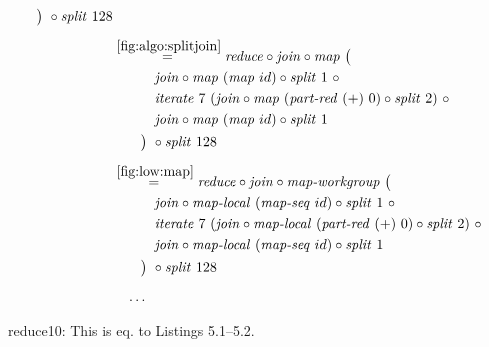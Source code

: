 \begin{figure*}[t]
\begin{align*}
\begin{aligned}
    &\qquad\big)\ \circ \splitN\ 128
  \end{aligned}\\[.5em]
%
  &\hspace{-2em}\quad\begin{aligned}
    &\overset{\ref{fig:algo:splitjoin}}{=\hspace{.2em}}
      \reduce \circ \join \circ \map\ \big(\\
    &\qquad\quad\join \circ \map\ (\map\ id) \circ \splitN\ 1\ \circ\\
    &\qquad\quad\iterateN\ 7\ (\join \circ \map\ (\partRed\ (+)\ 0) \circ \splitN\ 2)\ \circ\\
    &\qquad\quad\join \circ \map\ (\map\ id) \circ \splitN\ 1\\
    &\qquad\big)\ \circ \splitN\ 128
  \end{aligned}\\[.5em]
%
  &\hspace{-2em}\quad\begin{aligned}
    &\overset{\ref{fig:low:map}}{=\hspace{.2em}}
      \reduce \circ \join \circ \mapWorkgroup\ \big(\\
    &\qquad\quad\join \circ \mapLocal\ (\mapSeq\ id) \circ \splitN\ 1\ \circ\\
    &\qquad\quad\iterateN\ 7\ (\join \circ \mapLocal\ (\partRed\ (+)\ 0) \circ \splitN\ 2)\ \circ\\
    &\qquad\quad\join \circ \mapLocal\ (\mapSeq\ id) \circ \splitN\ 1\\
    &\qquad\big)\ \circ \splitN\ 128
  \end{aligned}\\[.5em]
%
  &\ldots
\end{align*}
\caption{reduce10: This is eq. to Listings 5.1--5.2.}
\end{figure*}

